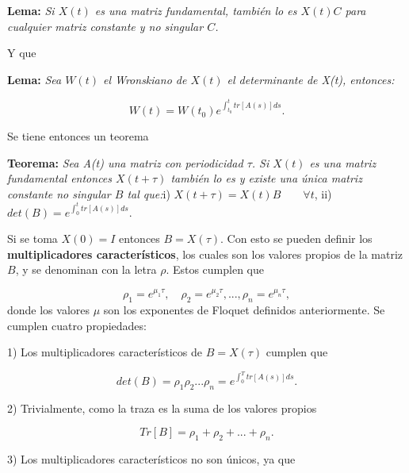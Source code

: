 \documentclass[10pt,a4paper]{report}
\begin{document}
\begin{center}
\textbf{Lema:} \textit{Si $X(t)$ es una matriz fundamental, también lo es $X(t)C$ para cualquier matriz constante y no singular $C$.}
\end{center}Y que

\begin{center}
\textbf{Lema:} \textit{Sea $W(t)$ el Wronskiano de $X(t)$ el determinante de X(t), entonces:}

\begin{equation}
W(t) = W(t_0) e^{\int_{t_0}^{t}tr[A(s)]ds}.
\end{equation}
 
\end{center} Se tiene entonces un teorema

\begin{center}
\textbf{Teorema:} \textit{Sea A(t) una matriz con periodicidad $\tau$. Si $X(t)$ es una matriz fundamental entonces $X(t+\tau)$ también lo es y existe una única matriz constante no singular $B$ tal que:}\linebreak \linebreak i) $X(t+\tau) = X(t)B \qquad\forall t$, \linebreak ii) $det(B) = e^{\int_0^t tr[A(s)]ds}.$
\end{center}Si se toma $X(0)=I$ entonces $B=X(\tau)$. Con esto se pueden definir los \textbf{multiplicadores característicos}, los cuales son los valores propios de la matriz $B$, y se denominan con la letra $\rho$. Estos cumplen que

\begin{equation}
\rho_1 = e^{\mu_1 \tau}, \quad \rho_2 = e^{\mu_2 \tau}, ... , \rho_n = e^{\mu_n \tau},
\end{equation} donde los valores $\mu$ son los exponentes de Floquet definidos anteriormente. Se cumplen cuatro propiedades:

1) Los multiplicadores característicos de $B=X(\tau)$ cumplen que

\begin{equation}
det(B) = \rho_1 \rho_2 ... \rho_n = e^{\int_0^T tr[A(s)]ds}.
\end{equation}

2) Trivialmente, como la traza es la suma de los valores propios

\begin{equation}
Tr[B] = \rho_1 + \rho_2 + ... + \rho_n.
\end{equation}

3) Los multiplicadores característicos no son únicos, ya que
\end{document}
